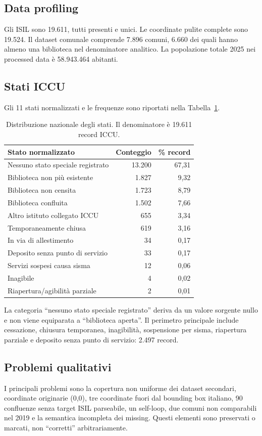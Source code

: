 \documentclass[11pt,a4paper]{article}
\begin{document}
\subsection{Data profiling}
Gli ISIL sono 19.611, tutti presenti e unici. Le coordinate pulite complete sono 19.524. Il dataset comunale comprende 7.896 comuni, 6.660 dei quali hanno almeno una biblioteca nel denominatore analitico. La popolazione totale 2025 nei processed data è 58.943.464 abitanti.

\subsection{Stati ICCU}
Gli 11 stati normalizzati e le frequenze sono riportati nella Tabella~\ref{tab:status}.
\begin{table}[H]
\centering
\small
\begin{tabularx}{\textwidth}{Xrr}
\toprule
Stato normalizzato & Conteggio & \% record \\
\midrule
Nessuno stato speciale registrato & 13.200 & 67,31 \\
Biblioteca non più esistente & 1.827 & 9,32 \\
Biblioteca non censita & 1.723 & 8,79 \\
Biblioteca confluita & 1.502 & 7,66 \\
Altro istituto collegato ICCU & 655 & 3,34 \\
Temporaneamente chiusa & 619 & 3,16 \\
In via di allestimento & 34 & 0,17 \\
Deposito senza punto di servizio & 33 & 0,17 \\
Servizi sospesi causa sisma & 12 & 0,06 \\
Inagibile & 4 & 0,02 \\
Riapertura/agibilità parziale & 2 & 0,01 \\
\bottomrule
\end{tabularx}
\caption{Distribuzione nazionale degli stati. Il denominatore è 19.611 record ICCU.}
\label{tab:status}
\end{table}

La categoria ``nessuno stato speciale registrato'' deriva da un valore sorgente nullo e non viene equiparata a ``biblioteca aperta''. Il perimetro principale include cessazione, chiusura temporanea, inagibilità, sospensione per sisma, riapertura parziale e deposito senza punto di servizio: 2.497 record.

\subsection{Problemi qualitativi}
I principali problemi sono la copertura non uniforme dei dataset secondari, coordinate originarie (0,0), tre coordinate fuori dal bounding box italiano, 90 confluenze senza target ISIL parseabile, un self-loop, due comuni non comparabili nel 2019 e la semantica incompleta dei missing. Questi elementi sono preservati o marcati, non ``corretti'' arbitrariamente.
\end{document}

